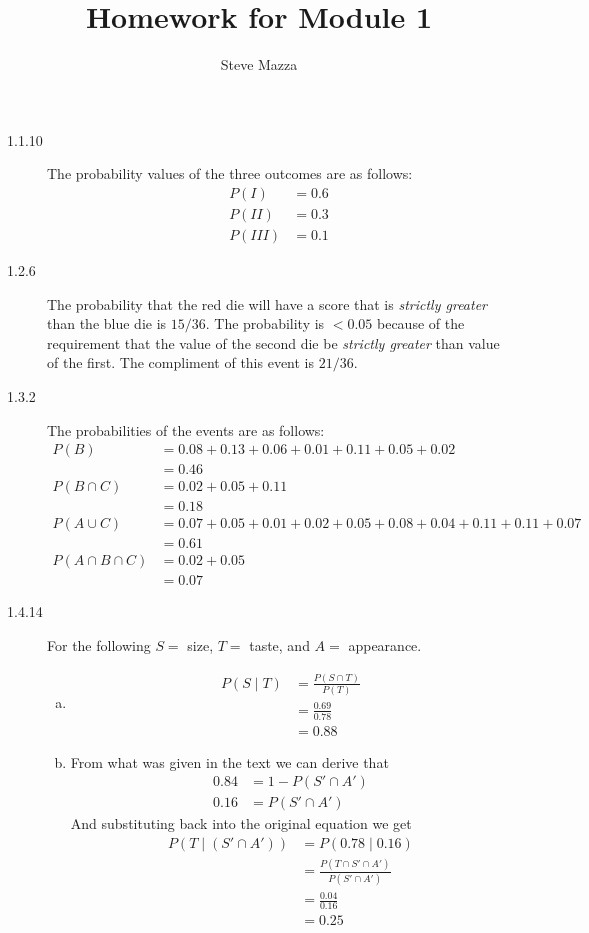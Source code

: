 \documentclass[letterpaper,10pt]{article}
\title{Homework for Module 1}
\author{Steve Mazza}
\begin{document}
\maketitle

\begin{description}
\item[1.1.10] 
The probability values of the three outcomes are as follows:
\begin{align*}
P(I) &= 0.6 \\ 
P(II) &= 0.3 \\ 
P(III) &= 0.1
\end{align*}

\item[1.2.6]
The probability that the red die will have a score that is \emph{strictly greater} than the blue die is $15/36$.  The probability is $< 0.05$ because of the requirement that the value of the second die be \emph{strictly greater} than value of the first.  The compliment of this event is $21/36$.

\item[1.3.2]
The probabilities of the events are as follows:
\begin{align*}
P(B) &= 0.08 + 0.13 + 0.06 + 0.01 + 0.11 + 0.05 + 0.02 \\
&= 0.46 \\
P(B\cap C) &=  0.02 + 0.05 + 0.11 \\
&= 0.18 \\
P(A \cup C) &= 0.07 + 0.05 + 0.01 + 0.02 + 0.05 + 0.08 + 0.04 + 0.11 + 0.11 + 0.07 \\
&= 0.61 \\
P(A \cap B \cap C) &= 0.02 + 0.05 \\
&= 0.07
\end{align*}
	
\item[1.4.14]
For the following $S =$ size, $T =$ taste, and $A =$ appearance.
\begin{enumerate}[a)]
\item 
\begin{align*}
P(S\mid T) &= \frac{P(S\cap T)}{P(T)} \\
&= \frac{0.69}{0.78} \\
&= 0.88
\end{align*}
\item 
From what was given in the text we can derive that
\begin{align*}
0.84 &= 1 - P(S'\cap A') \\
0.16 &= P(S'\cap A')
\end{align*}
And substituting back into the original equation we get
\begin{align*}
P(T\mid (S'\cap A')) &= P(0.78\mid 0.16) \\
&= \frac{P(T\cap S'\cap A')}{P(S'\cap A')} \\
&= \frac{0.04}{0.16} \\
&= 0.25
\end{align*}
\end{enumerate}


\end{description}
\end{document}
